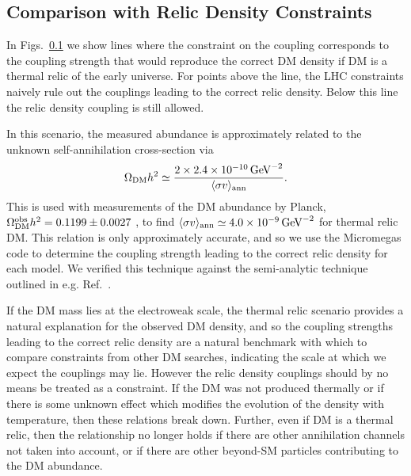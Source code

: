 
\subsection{Comparison with Relic Density Constraints}


In Figs.~\ref{} we show lines where the constraint on the coupling corresponds to the coupling strength that would reproduce the correct DM density if DM is a thermal relic of the early universe. For points above the line, the LHC constraints naively rule out the couplings leading to the correct relic density. Below this line the relic density coupling is still allowed.

 In this scenario, the measured abundance is approximately related to the unknown self-annihilation cross-section via
%
\begin{equation}
  \Omega_{\rm DM}h^2\simeq \frac{2\times2.4\times 10^{-10}\,{\rm GeV}^{-2}}{\langle\sigma v\rangle_{\rm ann}}.
  \label{simplerelic}
\end{equation}
%
This is used with measurements of the DM abundance by Planck, $\Omega_{\rm DM}^{\rm obs}h^2=0.1199\pm0.0027$ \cite{Ade:2013zuv}, to find $\langle\sigma v\rangle_{\rm ann}\simeq 4.0\times 10^{-9}\,{\rm GeV}^{-2}$ for thermal relic DM.
%
This relation is only approximately accurate, and so we use the Micromegas code \cite{Belanger:2014vza} to determine the coupling strength leading to the correct relic density for each model. We verified this technique against the semi-analytic technique outlined in e.g. Ref.~\cite{Busoni:2014gta}.

If the DM mass lies at the electroweak scale, the thermal relic scenario provides a natural explanation for the observed DM density, and so the coupling strengths leading to the correct relic density are a natural  benchmark with which to compare constraints from other DM searches, indicating the scale at which we expect the couplings may lie. However the relic density couplings should by no means be treated as a constraint. If the DM was not produced thermally or if there is some unknown effect which modifies the evolution of the density with temperature, then these relations break down. Further, even if DM is a thermal relic, then the relationship no longer holds if there are other annihilation channels not taken into account, or if there are other beyond-SM particles contributing to the DM abundance.


